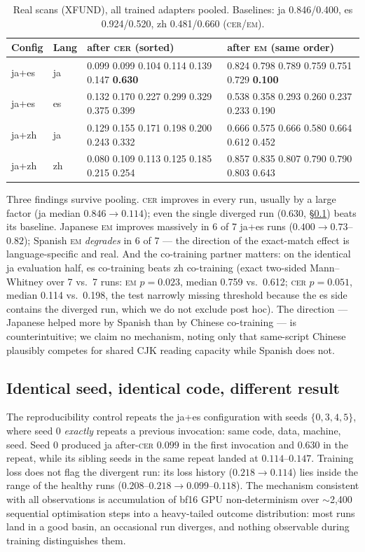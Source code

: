\documentclass[11pt]{article}
\newcommand{\cer}{\textsc{cer}}
\newcommand{\EM}{\textsc{em}}
\begin{document}
\begin{table}[t]
\centering\small
\caption{Real scans (XFUND), all trained adapters pooled. Baselines: ja
0.846/0.400, es 0.924/0.520, zh 0.481/0.660 (\cer{}/\EM{}).}
\label{tab:real}
\begin{tabular}{llll}
\toprule
Config & Lang & after \cer{} (sorted) & after \EM{} (same order) \\
\midrule
ja+es & ja & 0.099 0.099 0.104 0.114 0.139 0.147 \textbf{0.630} &
             0.824 0.798 0.789 0.759 0.751 0.729 \textbf{0.100} \\
ja+es & es & 0.132 0.170 0.227 0.299 0.329 0.375 0.399 &
             0.538 0.358 0.293 0.260 0.237 0.233 0.190 \\
ja+zh & ja & 0.129 0.155 0.171 0.198 0.200 0.243 0.332 &
             0.666 0.575 0.666 0.580 0.664 0.612 0.452 \\
ja+zh & zh & 0.080 0.109 0.113 0.125 0.185 0.215 0.254 &
             0.857 0.835 0.807 0.790 0.790 0.803 0.643 \\
\bottomrule
\end{tabular}
\end{table}

Three findings survive pooling. \cer{} improves in every run, usually by a
large factor (ja median $0.846\to0.114$); even the single diverged run
(0.630, \S\ref{sec:repro}) beats its baseline. Japanese \EM{} improves
massively in 6 of 7 ja+es runs ($0.400\to0.73$--$0.82$); Spanish \EM{}
\emph{degrades} in 6 of 7 --- the direction of the exact-match effect is
language-specific and real. And the co-training partner matters: on the
identical ja evaluation half, es co-training beats zh co-training (exact
two-sided Mann--Whitney over 7 vs.\ 7 runs: \EM{} $p=0.023$, median 0.759
vs.\ 0.612; \cer{} $p=0.051$, median 0.114 vs.\ 0.198, the test narrowly
missing threshold because the es side contains the diverged run, which we do
not exclude post hoc). The direction --- Japanese helped more by Spanish
than by Chinese co-training --- is counterintuitive; we claim no mechanism,
noting only that same-script Chinese plausibly competes for shared CJK
reading capacity while Spanish does not.

\subsection{Identical seed, identical code, different
result}\label{sec:repro}

The reproducibility control repeats the ja+es configuration with seeds
$\{0,3,4,5\}$, where seed 0 \emph{exactly} repeats a previous invocation:
same code, data, machine, seed. Seed 0 produced ja after-\cer{} $0.099$ in
the first invocation and $0.630$ in the repeat, while its sibling seeds in
the same repeat landed at $0.114$--$0.147$. Training loss does not flag the
divergent run: its loss history ($0.218\to0.114$) lies inside the range of
the healthy runs ($0.208$--$0.218\to0.099$--$0.118$). The mechanism
consistent with all observations is accumulation of bf16 GPU
non-determinism over $\sim$2{,}400 sequential optimisation steps into a
heavy-tailed outcome distribution: most runs land in a good basin, an
occasional run diverges, and nothing observable during training
distinguishes them.
\end{document}
